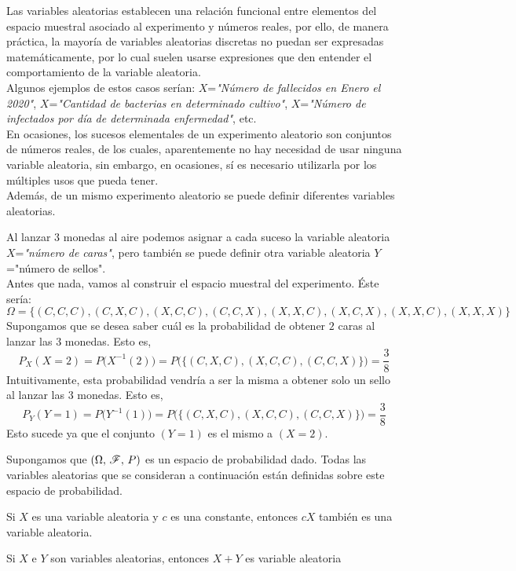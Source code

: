 Las variables aleatorias establecen una relación funcional entre elementos del espacio muestral asociado al experimento y números reales, por ello, de manera práctica, la mayoría de variables aleatorias discretas no puedan ser expresadas matemáticamente, por lo cual suelen usarse expresiones que den entender el comportamiento de la variable aleatoria. \\Algunos ejemplos de estos casos serían: $X$=\textit{"Número de fallecidos en Enero el 2020"}, $X$=\textit{"Cantidad de bacterias en determinado cultivo"}, $X$=\textit{"Número de infectados por día de determinada enfermedad"}, etc.\\
En ocasiones, los sucesos elementales de un experimento aleatorio son conjuntos de números reales, de los cuales, aparentemente no hay necesidad de usar ninguna variable aleatoria, sin embargo, en ocasiones, sí es necesario utilizarla por los múltiples usos que pueda tener.\\
Además, de un mismo experimento aleatorio se puede definir diferentes variables aleatorias.
\begin{Ejm}
    Al lanzar $3$ monedas al aire podemos asignar a cada suceso la variable aleatoria $X$=\textit{"número de caras"}, pero también se puede definir otra variable aleatoria $Y$="número de sellos". \\
    Antes que nada, vamos al construir el espacio muestral del experimento. Éste sería:
    $$\Omega = \{(C,C,C),(C,X,C), (X,C,C), (C,C,X), (X,X,C), (X,C,X), (X,X,C), (X,X,X)\}$$
Supongamos que se desea saber cuál es la probabilidad de obtener $2$ caras al lanzar las $3$ monedas.
Esto es, $$P_{X}(X=2)= P\big(X^{-1}(2)\big)= P\big(\big\{(C,X,C), (X,C,C), (C,C,X)\big\}\big)=\frac{3}{8}$$
Intuitivamente, esta probabilidad vendría a ser la misma a obtener solo un sello al lanzar las $3$ monedas.
Esto es,
$$P_{Y}(Y=1)= P\big(Y^{-1}(1)\big)= P\big(\big\{(C,X,C), (X,C,C), (C,C,X)\big\}\big)=\frac{3}{8}$$
Esto sucede ya que el conjunto $(Y=1)$ es el mismo a $(X=2)$.
\end{Ejm}
Supongamos que $(\Omega,\thinspace \mathscr{F},\thinspace P)$ es un espacio de probabilidad dado. Todas las variables aleatorias que se consideran a continuación están definidas sobre este espacio de probabilidad.
\begin{Prop}
    Si $X$ es una variable aleatoria y $c$ es una constante, entonces $c X$ también es una variable aleatoria.
    \label{prop-variableAl-cXesVA}
\end{Prop}
\begin{Prop}
    Si $X$ e $Y$ son variables aleatorias, entonces $X+Y$ es variable aleatoria
    \label{prop-variableAl-X+YesVA}
\end{Prop}
